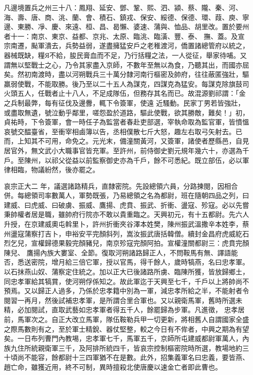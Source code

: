 \begin{pinyinscope}
 凡邊境置兵之州三十八：鳳翔、延安、鄧、鞏、熙、泗、潁、蔡、隴、秦、河、海、壽、唐、商、洮、蘭、會、積石、鎮戎、保安、綏德、保德、環、葭、庾、寧邊、東勝、凈、慶、來遠、桓、昌、曷懶、婆速、蒲與、恤品、胡里改。置於要州者十一：南京、東京、益都、京兆、太原、臨洮、臨潢、豐、泰、
 撫、蓋。及宣宗南遷，颭軍潰去，兵勢益弱，遂盡擁猛安戶之老稚渡河，僑置諸總管府以統之，器械既缺，糧Я不給，朘民膏血而不足，乃行括糧之法，一人從征，舉家待哺。又謂無以堅戰士之心，乃令其家盡入京師，不數年至無以為食，乃聽其出，而國亦屈矣。然初南渡時，盡以河朔戰兵三十萬分隸河南行樞密及帥府，往往蔽匿強壯，驅羸弱使戰，不能取勝。後乃至以二十五人為謀克，四謀克為猛安。每謀克除旗鼓司火頭五人，任戰者止十八人，不足成隊伍，但務存其名而已。故混源劉祁謂：「金之兵制最弊，每有征伐及邊釁，輒下令簽軍，使遠
 近騷動。民家丁男若皆強壯，或盡取無遺，號泣動乎鄰里，嗟怨盈於道路，驅此使戰，欲其勝敵，難矣！」初，貞祐時，下令簽軍，會一時任子為監當者春赴吏部選，宰執命取為監官軍，皆憤慍哀號交醖臺省，至衝宰相鹵簿以告，丞相僕散七斤大怒，趣左右取弓矢射去。已而，上知其不可用，命免之。元光末，備潼關黃河，又簽軍，諸使者歷縣邑，自見居官外，無文武小大職事官皆充軍。至許州，前侍御史劉元規年幾六十，亦選為千戶。至陳州，以祁父從益以前監察御史亦為千戶，餘不可悉紀。既立部伍，必以軍律相臨，物議紛然，後亦罷之。



 哀宗正大二
 年，議選諸路精兵，直隸密院。先設總領六員，分路揀閱，因相合併。每總領司率數萬人，軍勢既張，乃易總領之名為都尉，班在隨朝四品之列，曰建威、曰虎威、曰破虜、振威、鷹揚、虎賁、振武、折衝、盪寇、殄寇。必以先嘗秉帥權者居是職，雖帥府行院亦不敢以貴重臨之。天興初元，有十五都尉。先六人升授，在京建威奧屯斡里卜，許州折衝夾谷澤本姓樊，陳州振武溫撒辛本姓李，蔡州盪寇蒲察打吉卜，申裕安平完顏斜列，嵩汝振武唐括韓僧。續封金昌府虎威紇石烈乞兒，宣權歸德果毅完顏豬兒，南京殄寇完顏阿拍。宣權潼關都尉三：虎賁完顏陳兒、
 鷹揚內族大婁室、全節。復取河朔諸路歸正人，不問鞍馬有無、譯語能否，悉送密院，增月給三倍它軍，授以官馬，得千餘人，歲時犒燕，名曰忠孝軍。以石抹燕山奴、蒲察定住統之。加以正大已後諸路所虜、臨陳所獲，皆放歸鄉土，同忠孝軍給其犒賞，使河朔俘係知之。故此軍迄于天興至七千，千戶以上將帥尚不預焉。又以歸正人過多，乃係於忠孝籍中別為一軍，減忠孝所給之半，不能射者令閱習一再月，然後試補忠孝軍，是所謂合里合軍也。又以親衛馬軍，舊時所選未精，必加閱試，直取武藝如忠孝軍者得五千人，餘罷歸為步軍。凡進徵，
 忠孝居前，馬軍次之。自正大改立馬軍，隊伍鞍勒兵甲一切更新，將相舊人自謂國家全盛之際馬數則有之，至於軍士精銳、器仗堅整，較之今日有不侔者，中興之期為有望矣。一日布列曹門內教埸，忠孝軍七千，馬軍五千，京師所屯建威都尉軍萬人，內族九住所統親衛軍三千，及阿排所統四千，皆哀宗控制樞密院時所選，教場地約三十頃尚不能容，餘都尉十三四軍猶不在是數。此外，招集義軍名曰忠義，要皆燕、趙亡命，雖獲近用，終不可制，異時擅殺北使唐慶以速金亡者即此曹也。




\end{pinyinscope}
